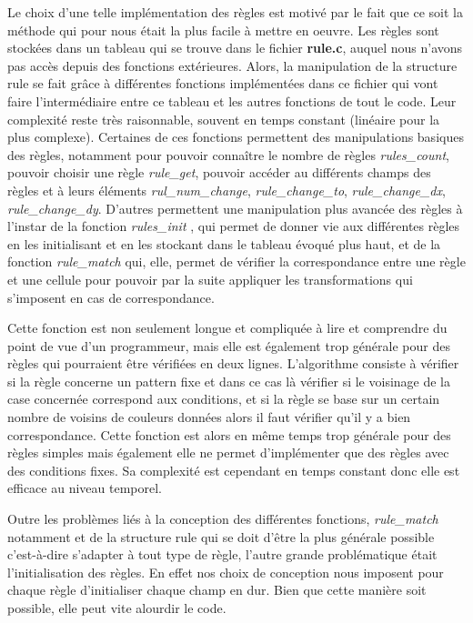 \documentclass[11pt, a4paper]{article}
\begin{document}
Le choix d'une telle implémentation des règles est motivé par le fait que ce soit la méthode qui pour nous était la plus facile à mettre en oeuvre.
Les règles sont stockées dans un tableau qui se trouve dans le fichier \textbf{rule.c}, auquel nous n'avons pas accès depuis des fonctions extérieures. Alors, la manipulation de la structure rule se fait grâce à différentes fonctions implémentées dans ce fichier qui vont faire l'intermédiaire entre ce tableau et les autres fonctions de tout le code. Leur complexité reste très raisonnable, souvent en temps constant (linéaire pour la plus complexe). Certaines de ces fonctions permettent des manipulations basiques des règles, notamment pour pouvoir connaître le nombre de règles \textit{rules\_count}, pouvoir choisir une règle \textit{rule\_get}, pouvoir accéder au différents champs des règles et à leurs éléments \textit{rul\_num\_change}, \textit{rule\_change\_to}, \textit{rule\_change\_dx}, \textit{rule\_change\_dy}. D'autres permettent une manipulation plus avancée des règles à l'instar de la fonction \textit{ rules\_init },  qui permet de donner vie aux différentes règles en les initialisant et en les stockant dans le tableau évoqué plus haut, et de la fonction \textit{rule\_match} qui, elle, permet de vérifier la correspondance entre une règle et une cellule pour pouvoir par la suite appliquer les transformations qui s'imposent en cas de correspondance.


Cette fonction est non seulement longue et compliquée à lire et comprendre du point de vue d'un programmeur, mais elle est également trop générale pour des règles qui pourraient être vérifiées en deux lignes. L'algorithme consiste à vérifier si la règle concerne un pattern fixe et dans ce cas là vérifier si le voisinage de la case concernée correspond aux conditions, et si la règle se base sur un certain nombre de voisins de couleurs données alors il faut vérifier qu'il y a bien correspondance. 
Cette fonction est alors en même temps trop générale pour des règles simples mais également elle ne permet d'implémenter que des règles avec des conditions fixes. Sa complexité est cependant en temps constant donc elle est efficace au niveau temporel. 


Outre les problèmes liés à la conception des différentes fonctions, \textit{rule\_match} notamment et de la structure rule qui se doit d'être la plus générale possible c'est-à-dire s'adapter à tout type de règle, l'autre grande problématique était l'initialisation des règles. En effet nos choix de conception nous imposent pour chaque règle d'initialiser chaque champ en dur. Bien que cette manière soit possible, elle peut vite alourdir le code. 
\end{document}
